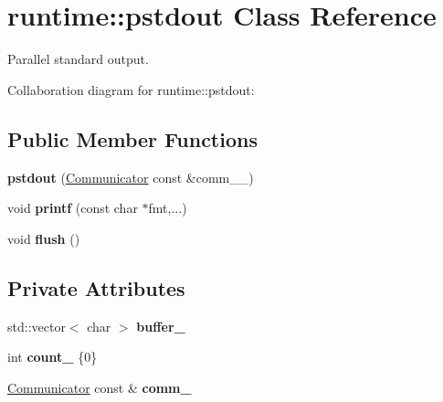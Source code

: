 \hypertarget{classruntime_1_1pstdout}{}\section{runtime\+:\+:pstdout Class Reference}
\label{classruntime_1_1pstdout}


Parallel standard output.  




Collaboration diagram for runtime\+:\+:pstdout\+:
\subsection*{Public Member Functions}
\begin{DoxyCompactItemize}
\item 
\hypertarget{classruntime_1_1pstdout_ae578eedf170996e6229ac0190b204c14}{}{\bfseries pstdout} (\hyperlink{classsddk_1_1_communicator}{Communicator} const \&comm\+\_\+\+\_\+)\label{classruntime_1_1pstdout_ae578eedf170996e6229ac0190b204c14}

\item 
\hypertarget{classruntime_1_1pstdout_a1173cc640908d1ec8da47b0814c420c6}{}void {\bfseries printf} (const char $\ast$fmt,...)\label{classruntime_1_1pstdout_a1173cc640908d1ec8da47b0814c420c6}

\item 
\hypertarget{classruntime_1_1pstdout_a61985cdbb63e47218d110e5d58b6e6f0}{}void {\bfseries flush} ()\label{classruntime_1_1pstdout_a61985cdbb63e47218d110e5d58b6e6f0}

\end{DoxyCompactItemize}
\subsection*{Private Attributes}
\begin{DoxyCompactItemize}
\item 
\hypertarget{classruntime_1_1pstdout_a942df3216eab3151f1911588641283cc}{}std\+::vector$<$ char $>$ {\bfseries buffer\+\_\+}\label{classruntime_1_1pstdout_a942df3216eab3151f1911588641283cc}

\item 
\hypertarget{classruntime_1_1pstdout_a4ac755e38e9b08c362f091038d324330}{}int {\bfseries count\+\_\+} \{0\}\label{classruntime_1_1pstdout_a4ac755e38e9b08c362f091038d324330}

\item 
\hypertarget{classruntime_1_1pstdout_ad3448d65008af72e6515359cfe43177f}{}\hyperlink{classsddk_1_1_communicator}{Communicator} const \& {\bfseries comm\+\_\+}\label{classruntime_1_1pstdout_ad3448d65008af72e6515359cfe43177f}

\end{DoxyCompactItemize}


